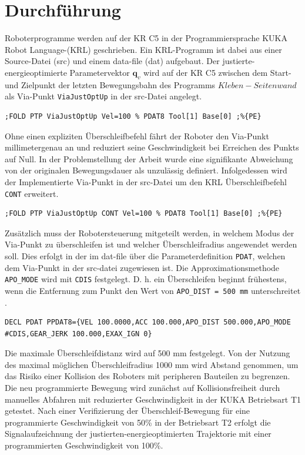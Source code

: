 \section{Durchführung}
Roboterprogramme werden auf der KR C5 in der Programmiersprache KUKA Robot Language-(KRL) geschrieben. Ein KRL-Programm ist dabei aus einer Source-Datei (src) und einem data-file (dat)  aufgebaut. Der justierte-energieoptimierte Parametervektor $\bm{q}_v$ wird auf der KR C5 zwischen dem Start- und Zielpunkt der letzten Bewegungsbahn des Programms $Kleben-Seitenwand$ als Via-Punkt \lstinline|ViaJustOptUp| in der src-Datei angelegt. 
\begin{lstlisting}[numbers=none]
	;FOLD PTP ViaJustOptUp Vel=100 % PDAT8 Tool[1] Base[0] ;%{PE}
\end{lstlisting}
Ohne einen expliziten Überschleifbefehl fährt der Roboter den Via-Punkt millimetergenau an und reduziert seine Geschwindigkeit bei Erreichen des Punkts auf Null. In der Problemstellung der Arbeit wurde eine signifikante Abweichung von der originalen Bewegungsdauer als unzulässig definiert. 
Infolgedessen wird der Implementierte Via-Punkt in der src-Datei um den KRL Überschleifbefehl \lstinline|CONT| erweitert. 
%
\begin{lstlisting}[numbers=none]
	;FOLD PTP ViaJustOptUp CONT Vel=100 % PDAT8 Tool[1] Base[0] ;%{PE}
\end{lstlisting}
%
Zusätzlich muss der Robotersteuerung mitgeteilt werden, in welchem Modus der Via-Punkt zu überschleifen ist und welcher Überschleifradius angewendet werden soll. Dies erfolgt in der im dat-file über die Parameterdefinition \lstinline|PDAT|, welchen dem Via-Punkt in der src-datei zugewiesen ist. 
Die Approximationsmethode \lstinline|APO_MODE| wird mit \lstinline|CDIS| festgelegt. D. h. ein Überschleifen beginnt frühestens, wenn die Entfernung zum Punkt den Wert von \lstinline|APO_DIST = 500 mm| unterschreitet \cite[S.~578]{KSS.2023}.
\begin{lstlisting}[numbers=none]
	DECL PDAT PPDAT8={VEL 100.0000,ACC 100.000,APO_DIST 500.000,APO_MODE #CDIS,GEAR_JERK 100.000,EXAX_IGN 0}
\end{lstlisting}
Die maximale Überschleifdistanz wird auf 500 mm festgelegt. Von der Nutzung des maximal möglichen Überschleifradius 1000 mm wird Abstand genommen, um das Risiko einer Kollision des Roboters mit peripheren Bauteilen zu begrenzen. Die neu programmierte Bewegung wird zunächst auf Kollisionsfreiheit durch manuelles Abfahren mit reduzierter Geschwindigkeit in der KUKA Betriebsart T1 getestet. Nach einer Verifizierung der Überschleif-Bewegung für eine programmierte Geschwindigkeit von 50\% in der Betriebsart T2 erfolgt die Signalaufzeichnung der justierten-energieoptimierten Trajektorie mit einer programmierten Geschwindigkeit von 100\%. 
%
